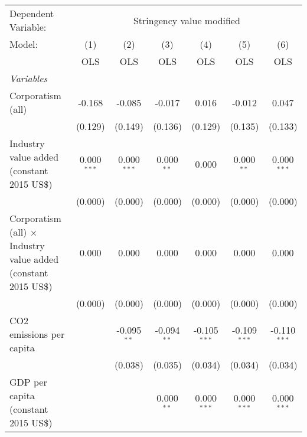 
\begingroup
\centering
\begin{tabular}{lcccccc}
   \toprule
   Dependent Variable: & \multicolumn{6}{c}{Stringency value modified}\\
   Model:                                                                 & (1)           & (2)           & (3)           & (4)            & (5)            & (6)\\  
                                                                          &  OLS          & OLS           & OLS           & OLS            & OLS            & OLS\\  
   \midrule
   \emph{Variables}\\
   Corporatism (all)                                                      & -0.168        & -0.085        & -0.017        & 0.016          & -0.012         & 0.047\\   
                                                                          & (0.129)       & (0.149)       & (0.136)       & (0.129)        & (0.135)        & (0.133)\\   
   Industry value added (constant 2015 US\$)                              & 0.000$^{***}$ & 0.000$^{***}$ & 0.000$^{**}$  & 0.000          & 0.000$^{**}$   & 0.000$^{***}$\\   
                                                                          & (0.000)       & (0.000)       & (0.000)       & (0.000)        & (0.000)        & (0.000)\\   
   Corporatism (all) $\times$ Industry value added (constant 2015 US\$)   & 0.000         & 0.000         & 0.000         & 0.000          & 0.000          & 0.000\\   
                                                                          & (0.000)       & (0.000)       & (0.000)       & (0.000)        & (0.000)        & (0.000)\\   
   CO2 emissions per capita                                               &               & -0.095$^{**}$ & -0.094$^{**}$ & -0.105$^{***}$ & -0.109$^{***}$ & -0.110$^{***}$\\   
                                                                          &               & (0.038)       & (0.035)       & (0.034)        & (0.034)        & (0.034)\\   
   GDP per capita (constant 2015 US\$)                                    &               &               & 0.000$^{**}$  & 0.000$^{***}$  & 0.000$^{***}$  & 0.000$^{***}$\\   

\end{tabular}
